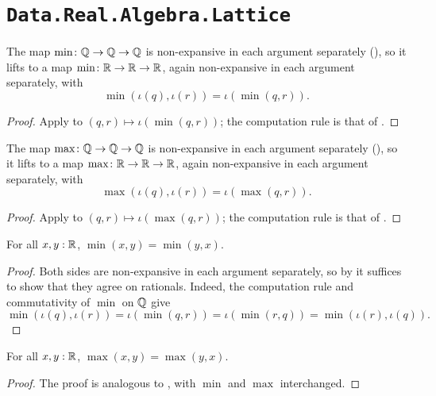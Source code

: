 \section{\texttt{Data.Real.Algebra.Lattice}}

\begin{definition}
  \label{minNReal}
  The map $\min \colon \mathbb{Q} \to \mathbb{Q} \to \mathbb{Q}$ is non-expansive in each argument separately (), so it lifts to a map $\min \colon \mathbb{R} \to \mathbb{R} \to \mathbb{R}$, again non-expansive in each argument separately, with
  \[
    \min(\iota(q),\iota(r)) = \iota(\min(q,r)).
  \]
\end{definition}
\begin{proof}
  Apply  to $(q, r) \mapsto \iota(\min(q, r))$; the computation rule is that of .
\end{proof}

\begin{definition}
  \label{maxNReal}
  The map $\max \colon \mathbb{Q} \to \mathbb{Q} \to \mathbb{Q}$ is non-expansive in each argument separately (), so it lifts to a map $\max \colon \mathbb{R} \to \mathbb{R} \to \mathbb{R}$, again non-expansive in each argument separately, with
  \[
    \max(\iota(q),\iota(r)) = \iota(\max(q,r)).
  \]
\end{definition}
\begin{proof}
  Apply  to $(q, r) \mapsto \iota(\max(q, r))$; the computation rule is that of .
\end{proof}

\begin{lemma}
  \label{minCommReal}
  For all $x, y : \mathbb{R}$, $\min(x, y) = \min(y, x)$.
\end{lemma}
\begin{proof}
  Both sides are non-expansive in each argument separately, so by  it suffices to show that they agree on rationals. Indeed, the computation rule  and commutativity of $\min$ on $\mathbb{Q}$ give
  \[
    \min(\iota(q),\iota(r)) = \iota(\min(q,r)) = \iota(\min(r,q)) = \min(\iota(r),\iota(q)).
  \]
\end{proof}

\begin{lemma}
  \label{maxCommReal}
  For all $x, y : \mathbb{R}$, $\max(x, y) = \max(y, x)$.
\end{lemma}
\begin{proof}
  The proof is analogous to , with $\min$ and $\max$ interchanged.
\end{proof}

